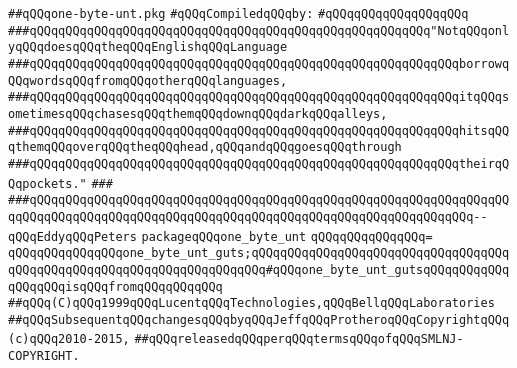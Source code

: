 \label{src/lib/std/one-byte-unt.pkg}
\verb|##qQQqone-byte-unt.pkg|\newline
\newline
\verb|#qQQqCompiledqQQqby:|\newline
\verb|#qQQqqQQqqQQqqQQqqQQq|\newline
\newline
\newline
\newline
\verb|###qQQqqQQqqQQqqQQqqQQqqQQqqQQqqQQqqQQqqQQqqQQqqQQqqQQqqQQq"NotqQQqonlyqQQqdoesqQQqtheqQQqEnglishqQQqLanguage|\newline
\verb|###qQQqqQQqqQQqqQQqqQQqqQQqqQQqqQQqqQQqqQQqqQQqqQQqqQQqqQQqqQQqborrowqQQqwordsqQQqfromqQQqotherqQQqlanguages,|\newline
\verb|###qQQqqQQqqQQqqQQqqQQqqQQqqQQqqQQqqQQqqQQqqQQqqQQqqQQqqQQqqQQqitqQQqsometimesqQQqchasesqQQqthemqQQqdownqQQqdarkqQQqalleys,|\newline
\verb|###qQQqqQQqqQQqqQQqqQQqqQQqqQQqqQQqqQQqqQQqqQQqqQQqqQQqqQQqqQQqhitsqQQqthemqQQqoverqQQqtheqQQqhead,qQQqandqQQqgoesqQQqthrough|\newline
\verb|###qQQqqQQqqQQqqQQqqQQqqQQqqQQqqQQqqQQqqQQqqQQqqQQqqQQqqQQqqQQqtheirqQQqpockets."|\newline
\verb|###|\newline
\verb|###qQQqqQQqqQQqqQQqqQQqqQQqqQQqqQQqqQQqqQQqqQQqqQQqqQQqqQQqqQQqqQQqqQQqqQQqqQQqqQQqqQQqqQQqqQQqqQQqqQQqqQQqqQQqqQQqqQQqqQQqqQQqqQQqqQQq--qQQqEddyqQQqPeters|\newline
\newline
\newline
\newline
\verb|packageqQQqone_byte_unt|\newline
\verb|qQQqqQQqqQQqqQQq=|\newline
\verb|qQQqqQQqqQQqqQQqone_byte_unt_guts;qQQqqQQqqQQqqQQqqQQqqQQqqQQqqQQqqQQqqQQqqQQqqQQqqQQqqQQqqQQqqQQqqQQqqQQq#qQQqone_byte_unt_gutsqQQqqQQqqQQqqQQqqQQqisqQQqfromqQQqqQQqqQQq|\newline
\newline
\newline
\newline
\verb|##qQQq(C)qQQq1999qQQqLucentqQQqTechnologies,qQQqBellqQQqLaboratories|\newline
\verb|##qQQqSubsequentqQQqchangesqQQqbyqQQqJeffqQQqProtheroqQQqCopyrightqQQq(c)qQQq2010-2015,|\newline
\verb|##qQQqreleasedqQQqperqQQqtermsqQQqofqQQqSMLNJ-COPYRIGHT.|\newline

